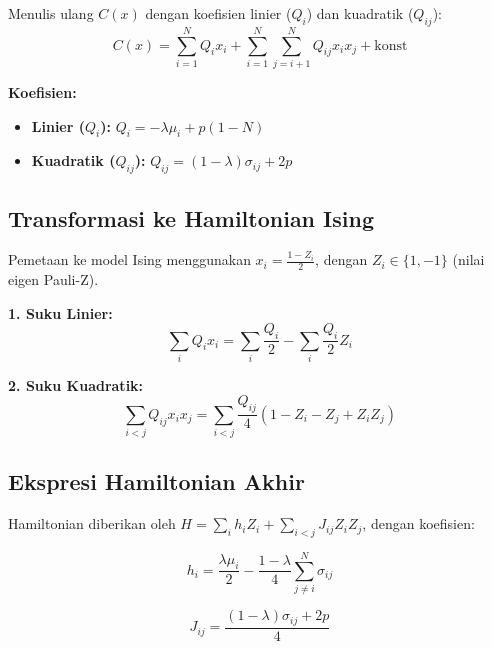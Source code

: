 Menulis ulang $C(x)$ dengan koefisien linier ($Q_i$) dan kuadratik ($Q_{ij}$):
\begin{equation}
    C(x) = \sum_{i=1}^{N} Q_i x_i + \sum_{i=1}^{N} \sum_{j=i+1}^{N} Q_{ij} x_i x_j + \text{konst}
\end{equation}

\textbf{Koefisien:}
\begin{itemize}
    \item \textbf{Linier ($Q_i$):} $Q_i = -\lambda \mu_i + p(1 - N)$
    \item \textbf{Kuadratik ($Q_{ij}$):} $Q_{ij} = (1-\lambda) \sigma_{ij} + 2p$
\end{itemize}

\subsection{Transformasi ke Hamiltonian Ising}

Pemetaan ke model Ising menggunakan $x_i = \frac{1 - Z_i}{2}$, dengan $Z_i \in \{1, -1\}$ (nilai eigen Pauli-Z).

\textbf{1. Suku Linier:}
$$ \sum_{i} Q_i x_i = \sum_{i} \frac{Q_i}{2} - \sum_{i} \frac{Q_i}{2} Z_i $$

\textbf{2. Suku Kuadratik:}
$$ \sum_{i<j} Q_{ij} x_i x_j = \sum_{i<j} \frac{Q_{ij}}{4} (1 - Z_i - Z_j + Z_i Z_j) $$

\subsection{Ekspresi Hamiltonian Akhir}

Hamiltonian diberikan oleh $H = \sum_{i} h_i Z_i + \sum_{i<j} J_{ij} Z_i Z_j$, dengan koefisien:

\begin{equation}
    h_i = \frac{\lambda \mu_i}{2} - \frac{1-\lambda}{4} \sum_{j \neq i}^N \sigma_{ij}
\end{equation}

\begin{equation}
    J_{ij} = \frac{(1-\lambda) \sigma_{ij} + 2p}{4}
\end{equation}
